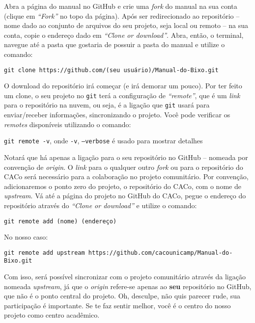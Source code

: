 \documentclass[a4paper,oneside,10pt]{memoir}
\begin{document}
Abra a página do manual no GitHub e crie uma \emph{fork} do manual na sua conta
(clique em \emph{“Fork”} no topo da página). Após ser redirecionado ao
repositório -- nome dado ao conjunto de arquivos do seu projeto, seja local
ou remoto -- na sua conta, copie o endereço dado em \emph{“Clone or download”}.
Abra, então, o terminal, navegue até a pasta que gostaria de possuir a pasta do
manual e utilize o comando:

\begin{center}
\texttt{git clone https://github.com/(seu usuário)/Manual-do-Bixo.git}
\end{center}

O download do repositório irá começar (e irá demorar um pouco). Por ter feito
um clone, o seu projeto no \texttt{git} terá a configuração de \emph{“remote”},
que é um \emph{link} para o repositório na nuvem, ou seja, é a ligação que
\texttt{git} usará para enviar/receber informações, sincronizando o projeto.
Você pode verificar os \emph{remotes} disponíveis utilizando o comando:

\begin{center}
\texttt{git remote -v}, onde \texttt{-v}, \texttt{--verbose} é usado para
mostrar detalhes
\end{center}

Notará que há apenas a ligação para o seu repositório no GitHub -- nomeada
por convenção de \emph{origin}. O \emph{link} para o qualquer outro \emph{fork}
ou para o repositório do CACo será necessário para a colaboração no projeto
comunitário. Por convenção, adicionaremos o ponto zero do projeto, o
repositório do CACo, com o nome de \emph{upstream}. Vá até a página do projeto
no GitHub do CACo, pegue o endereço do repositório através do \emph{“Clone or
download”} e utilize o comando:

\begin{center}
\texttt{git remote add (nome) (endereço)}
\end{center}

No nosso caso:
\begin{center}
\texttt{git remote add upstream
https://github.com/cacounicamp/Manual-do-Bixo.git}
\end{center}

Com isso, será possível sincronizar com o projeto comunitário através da
ligação nomeada \emph{upstream}, já que o \emph{origin} refere-se apenas ao
\textbf{seu} repositório no GitHub, que não é o ponto central do projeto. Oh,
desculpe, não quis parecer rude, sua participação é importante. Se te faz
sentir melhor, você é o centro do nosso projeto como centro acadêmico.
\end{document}
